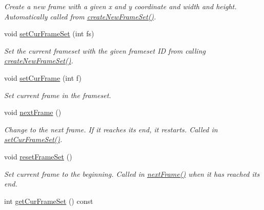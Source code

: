 \begin{DoxyCompactItemize}
\begin{DoxyCompactList}\small\item\em Create a new frame with a given x and y coordinate and width and height. Automatically called from \hyperlink{classObject_a21238c368f570c14722cb00b74353732}{create\+New\+Frame\+Set()}. \end{DoxyCompactList}\item 
void \hyperlink{classObject_a061542647f10e3f30565ad9f56dc64c4}{set\+Cur\+Frame\+Set} (int fs)\hypertarget{classObject_a061542647f10e3f30565ad9f56dc64c4}{}\label{classObject_a061542647f10e3f30565ad9f56dc64c4}

\begin{DoxyCompactList}\small\item\em Set the current frameset with the given frameset ID from calling \hyperlink{classObject_a21238c368f570c14722cb00b74353732}{create\+New\+Frame\+Set()}. \end{DoxyCompactList}\item 
void \hyperlink{classObject_aef259fb0225c8995ec2c0ebe04c98cd9}{set\+Cur\+Frame} (int f)\hypertarget{classObject_aef259fb0225c8995ec2c0ebe04c98cd9}{}\label{classObject_aef259fb0225c8995ec2c0ebe04c98cd9}

\begin{DoxyCompactList}\small\item\em Set current frame in the frameset. \end{DoxyCompactList}\item 
void \hyperlink{classObject_a2c123e98f36c3779f5172afefacbf69c}{next\+Frame} ()\hypertarget{classObject_a2c123e98f36c3779f5172afefacbf69c}{}\label{classObject_a2c123e98f36c3779f5172afefacbf69c}

\begin{DoxyCompactList}\small\item\em Change to the next frame. If it reaches its end, it restarts. Called in \hyperlink{classObject_a061542647f10e3f30565ad9f56dc64c4}{set\+Cur\+Frame\+Set()}. \end{DoxyCompactList}\item 
void \hyperlink{classObject_ab2a55c6e2908f754992cc1c281b01be8}{reset\+Frame\+Set} ()\hypertarget{classObject_ab2a55c6e2908f754992cc1c281b01be8}{}\label{classObject_ab2a55c6e2908f754992cc1c281b01be8}

\begin{DoxyCompactList}\small\item\em Set current frame to the beginning. Called in \hyperlink{classObject_a2c123e98f36c3779f5172afefacbf69c}{next\+Frame()} when it has reached its end. \end{DoxyCompactList}\item 
int \hyperlink{classObject_a3de9dd15d8ba28785284bccd2cfc406c}{get\+Cur\+Frame\+Set} () const \hypertarget{classObject_a3de9dd15d8ba28785284bccd2cfc406c}{}\label{classObject_a3de9dd15d8ba28785284bccd2cfc406c}


\end{DoxyCompactItemize}
